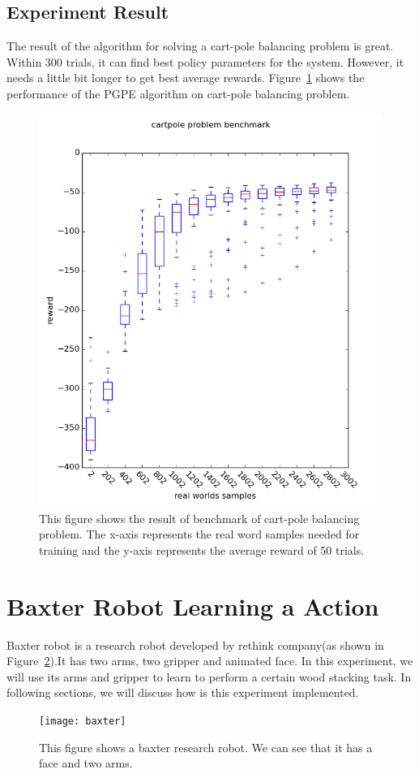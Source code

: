 \documentclass[officiallayout]{tktla}
\begin{document}
\subsection{Experiment Result}
The result of the algorithm for solving a cart-pole balancing problem is great. Within 300 trials, it can find best policy parameters for the system. However, it needs a little bit longer to get best average rewards. Figure~\ref{cart_pole_pgpe_benchmark} shows the performance of the PGPE algorithm on cart-pole balancing problem.
\begin{figure}[H]
\centering
\includegraphics[scale=0.7]{model_pgpe_benchatk}
\caption{This figure shows the result of benchmark of cart-pole balancing problem. The x-axis represents the real word samples needed for training and the y-axis represents the average reward of 50 trials.}
\label{cart_pole_pgpe_benchmark}
\end{figure}


\section{Baxter Robot Learning a Action}
Baxter robot is a research robot developed by rethink company(as shown in Figure~\ref{baxter}).It has two arms, two gripper and animated face. In this experiment, we will use its arms and gripper to learn to perform a certain wood stacking task. In following sections, we will discuss how is this experiment implemented.
\begin{figure}[h]
\centering
\texttt{[image: baxter]}
\label{baxter}
\caption{This figure shows a baxter research robot. We can see that it has a face and two arms.}
\end{figure}
\end{document}
